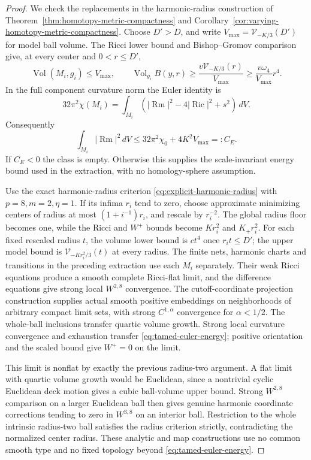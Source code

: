 \documentclass[11pt]{article}
\numberwithin{equation}{section}
\theoremstyle{definition}
\theoremstyle{remark}
\DeclareMathOperator{\Ric}{Ric}
\DeclareMathOperator{\Vol}{Vol}
\begin{document}
\begin{proof}
We check the replacements in the harmonic-radius construction
of Theorem~\ref{thm:homotopy-metric-compactness} and
Corollary~\ref{cor:varying-homotopy-metric-compactness}.
Choose $D'>D$, and write
$V_{\max}=\mathcal V_{-K/3}(D')$ for model ball volume.
The Ricci lower bound and Bishop--Gromov comparison give,
at every center and $0<r\le D'$,
\[
 \Vol(M_i,g_i)\le V_{\max},\qquad
 \Vol_{g_i}B(y,r)\ge
     \frac{v\mathcal V_{-K/3}(r)}{V_{\max}}
     \ge\frac{v\omega_4}{V_{\max}}r^4.
\]
In the full component curvature norm the Euler identity is
\[
 32\pi^2\chi(M_i)=\int_{M_i}
  (|\operatorname{Rm}|^2-4|\Ric|^2+s^2)\,dV.
\]
Consequently
\begin{equation}\label{eq:tamed-euler-energy}
 \int_{M_i}|\operatorname{Rm}|^2\,dV
 \le32\pi^2\chi_0+4K^2V_{\max}=:C_E.
\end{equation}
If $C_E<0$ the class is empty. Otherwise this supplies the
scale-invariant energy bound used in the extraction, with
no homology-sphere assumption.

Use the exact harmonic-radius criterion
\eqref{eq:explicit-harmonic-radius} with $p=8,m=2,\eta=1$. If its infima $r_i$ tend to zero,
choose approximate minimizing centers of radius at most
$(1+i^{-1})r_i$, and rescale by $r_i^{-2}$.
The global radius floor becomes one, while the Ricci and
$W^+$ bounds become $Kr_i^2$ and $K_+r_i^2$.
For each fixed rescaled radius $t$, the volume lower bound
is $ct^4$ once $r_it\le D'$; the upper model bound is
$\mathcal V_{-Kr_i^2/3}(t)$ at every radius.
The finite nets, harmonic charts and transitions in the
preceding extraction use each $M_i$ separately. Their
weak Ricci equations produce a smooth complete Ricci-flat
limit, and the difference equations give strong local
$W^{2,8}$ convergence. The cutoff-coordinate projection
construction supplies actual smooth positive embeddings
on neighborhoods of arbitrary compact limit sets, with
strong $C^{1,\alpha}$ convergence for $\alpha<1/2$.
The whole-ball inclusions transfer quartic volume growth.
Strong local curvature convergence and exhaustion transfer
\eqref{eq:tamed-euler-energy}; positive orientation and the
scaled bound give $W^+=0$ on the limit.

This limit is nonflat by exactly the previous radius-two
argument. A flat limit with quartic volume growth would
be Euclidean, since a nontrivial cyclic Euclidean deck
motion gives a cubic ball-volume upper bound. Strong
$W^{2,8}$ comparison on a larger Euclidean ball then gives
genuine harmonic coordinate corrections tending to zero
in $W^{3,8}$ on an interior ball. Restriction to the whole
intrinsic radius-two ball satisfies the radius criterion
strictly, contradicting the normalized center radius.
These analytic and map constructions use no common smooth
type and no fixed topology beyond
\eqref{eq:tamed-euler-energy}.


\end{proof}
\end{document}
